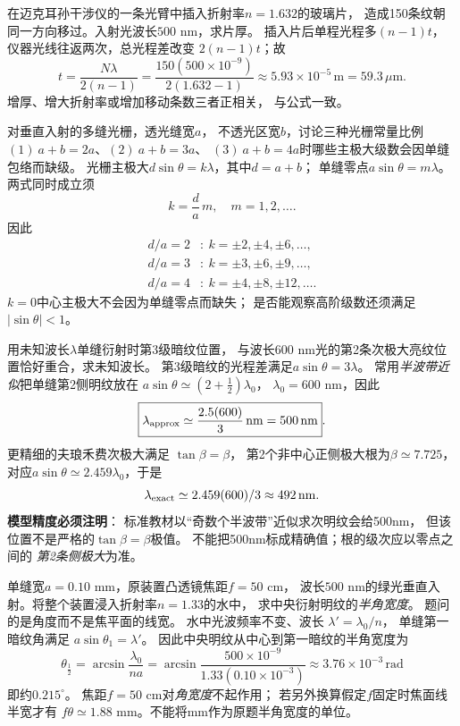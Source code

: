 \problemtext 在迈克耳孙干涉仪的一条光臂中插入折射率$n=1.632$的玻璃片，
造成150条纹朝同一方向移过。入射光波长$500$ nm，求片厚。
\workings
插入片后单程光程多$(n-1)t$，
仪器光线往返两次，总光程差改变
$2(n-1)t$；故
\[
\boxed{t=\frac{N\lambda}{2(n-1)}
=\frac{150(500\times10^{-9})}{2(1.632-1)}
\approx5.93\times10^{-5}\,\mathrm m
=59.3\,\mu\mathrm m}.
\]
\crosscheck 增厚、增大折射率或增加移动条数三者正相关，
与公式一致。

\problemtext 对垂直入射的多缝光栅，透光缝宽$a$，
不透光区宽$b$，讨论三种光栅常量比例
$(1)\ a+b=2a$、$(2)\ a+b=3a$、
$(3)\ a+b=4a$时哪些主极大级数会因单缝包络而缺级。
\workings
光栅主极大$d\sin\theta=k\lambda$，其中$d=a+b$；
单缝零点$a\sin\theta=m\lambda$。
两式同时成立须
\[
k=\frac{d}{a}\,m,\quad m=1,2,\ldots.
\]
因此
\[
\boxed{\begin{aligned}
d/a=2&:\ k=\pm2,\pm4,\pm6,\ldots,\\
d/a=3&:\ k=\pm3,\pm6,\pm9,\ldots,\\
d/a=4&:\ k=\pm4,\pm8,\pm12,\ldots.
\end{aligned}}
\]
\crosscheck $k=0$中心主极大不会因为单缝零点而缺失；
是否能观察高阶级数还须满足$|\sin\theta|<1$。

\problemtext 用未知波长$\lambda$单缝衍射时第3级暗纹位置，
与波长$600$ nm光的第2条次极大亮纹位置恰好重合，求未知波长。
\workings
第3级暗纹的光程差满足$a\sin\theta=3\lambda$。
常用\emph{半波带近似}把单缝第2侧明纹放在
$a\sin\theta\simeq(2+\tfrac12)\lambda_0$，
$\lambda_0=600$ nm，因此
\[
\boxed{\lambda_{\rm approx}
\simeq\frac{2.5(600)}{3}\,\mathrm{nm}=500\,\mathrm{nm}}.
\]
更精细的夫琅禾费次极大满足
$\tan\beta=\beta$，
第2个非中心正侧极大根为$\beta\simeq7.725$，
对应$a\sin\theta\simeq2.459\lambda_0$，于是
\[
\lambda_{\rm exact}\simeq2.459(600)/3\approx492\,\mathrm{nm}.
\]
\crosscheck \textbf{模型精度必须注明}：
标准教材以“奇数个半波带”近似求次明纹会给500nm，
但该位置不是严格的$\tan\beta=\beta$极值。
不能把500nm标成精确值；根的级次应以零点之间的
\emph{第2条侧极大}为准。

\problemtext 单缝宽$a=0.10$ mm，原装置凸透镜焦距$f=50$ cm，
波长$500$ nm的绿光垂直入射。将整个装置浸入折射率$n=1.33$的水中，
求中央衍射明纹的\emph{半角宽度}。
\workings
题问的是角度而不是焦平面的线宽。
水中光波频率不变、波长
$\lambda'=\lambda_0/n$，
单缝第一暗纹角满足
$a\sin\theta_1=\lambda'$。
因此中央明纹从中心到第一暗纹的半角宽度为
\[
\boxed{\theta_{\frac12}
=\arcsin\frac{\lambda_0}{na}
=\arcsin\frac{500\times10^{-9}}{1.33(0.10\times10^{-3})}
\approx3.76\times10^{-3}\,\mathrm{rad}}
\]
即约$\boxed{0.215^\circ}$。
\crosscheck 焦距$f=50$ cm对\emph{角宽度}不起作用；
若另外换算假定$f$固定时焦面线半宽才有
$f\theta\simeq1.88$ mm。不能将mm作为原题半角宽度的单位。

